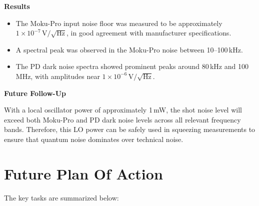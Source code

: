 \documentclass[colorlinks=true,pdfstartview=FitV,linkcolor=blue,
citecolor=red,urlcolor=magenta]{ligodoc}
\begin{document}
    

\textbf{Results}

\begin{itemize}
    \item The Moku-Pro input noise floor was measured to be approximately \(1 \times 10^{-7}\,\text{V}/\sqrt{\text{Hz}}\), in good agreement with manufacturer specifications.
    \item A spectral peak was observed in the Moku-Pro noise between 10–100\,kHz.
    \item The PD dark noise spectra showed prominent peaks around 80\,kHz and 100\,MHz, with amplitudes near \(1 \times 10^{-6}\,\text{V}/\sqrt{\text{Hz}}\). 
\end{itemize}

\textbf{Future Follow-Up}

With a local oscillator power of approximately 1\,mW, the shot noise level will exceed both Moku-Pro and PD dark noise levels across all relevant frequency bands. Therefore, this LO power can be safely used in squeezing measurements to ensure that quantum noise dominates over technical noise.




\section{Future Plan Of Action}



The key tasks are summarized below:
\end{document}
